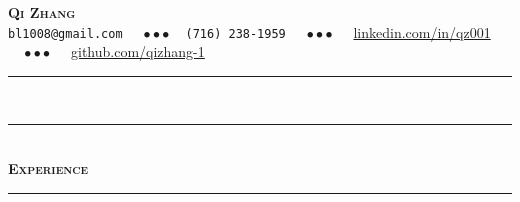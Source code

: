 \documentclass[12pt]{article}
\begin{document}
\begin{center}
{\huge\textbf{\textsc{{Qi  Zhang}}}} \\[5pt]

\small{ \texttt{bl1008@gmail.com}  $\quad\bullet\bullet\bullet\quad$\texttt{(716)\,238-1959} $\quad\bullet\bullet\bullet\quad$  \url{linkedin.com/in/qz001}  $\quad\bullet\bullet\bullet\quad$ \url{github.com/qizhang-1}}
\end{center}
 \rule[0.8em]{\textwidth}{0.5pt} \\[-11pt]
 \rule[0.8em]{\textwidth}{0.5pt} \\[0pt]
\textbf{\textsc{\LARGE{Experience}}} \\ \rule[0.8em]{\textwidth}{0.5pt} \\[-20pt]
\\
\end{document}
